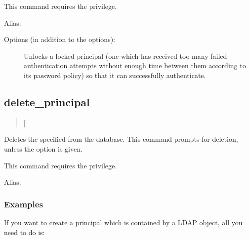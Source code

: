 \documentclass[letterpaper,10pt,english]{sphinxmanual}
\begin{document}
This command requires the  privilege.

Alias: 

Options (in addition to the  options):
\begin{description}
\item[{}] \leavevmode
Unlocks a locked principal (one which has received too many failed
authentication attempts without enough time between them according
to its password policy) so that it can successfully authenticate.

\end{description}


\subsection{delete\_principal}
\label{\detokenize{admin/database:delete-principal}}\begin{quote}

 {[}\sphinxstylestrong{-force}{]} 
\end{quote}

Deletes the specified  from the database.  This command
prompts for deletion, unless the  option is given.

This command requires the  privilege.

Alias: 


\subsubsection{Examples}
\label{\detokenize{admin/database:examples}}
If you want to create a principal which is contained by a LDAP object,
all you need to do is:
\end{document}

